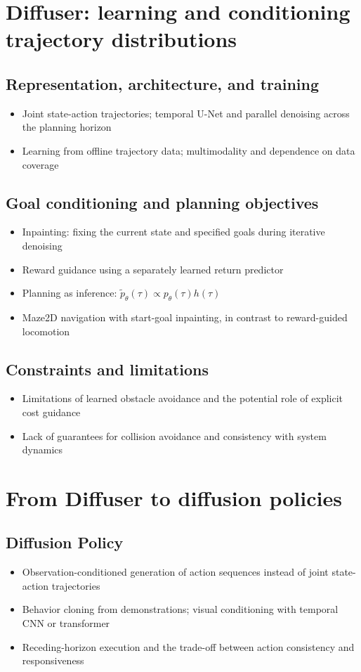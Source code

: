\documentclass[a4paper]{IEEEtran}
\begin{document}
\section{Diffuser: learning and conditioning trajectory distributions}
\subsection{Representation, architecture, and training}
\begin{itemize}
    \item Joint state-action trajectories; temporal U-Net and parallel denoising across the planning horizon~\cite{janner2022diffuser}
    \item Learning from offline trajectory data; multimodality and dependence on data coverage
\end{itemize}
\subsection{Goal conditioning and planning objectives}
\begin{itemize}
    \item Inpainting: fixing the current state and specified goals during iterative denoising
    \item Reward guidance using a separately learned return predictor
    \item Planning as inference: $\widetilde p_\theta(\tau)\propto p_\theta(\tau)h(\tau)$~\cite{levine2018inference}
    \item Maze2D navigation with start-goal inpainting, in contrast to reward-guided locomotion
\end{itemize}
\subsection{Constraints and limitations}
\begin{itemize}
    \item Limitations of learned obstacle avoidance and the potential role of explicit cost guidance
    \item Lack of guarantees for collision avoidance and consistency with system dynamics
\end{itemize}

\section{From Diffuser to diffusion policies}
\subsection{Diffusion Policy}
\begin{itemize}
    \item Observation-conditioned generation of action sequences instead of joint state-action trajectories~\cite{chi2025diffusionpolicy}
    \item Behavior cloning from demonstrations; visual conditioning with temporal CNN or transformer
    \item Receding-horizon execution and the trade-off between action consistency and responsiveness
\end{itemize}
\end{document}

